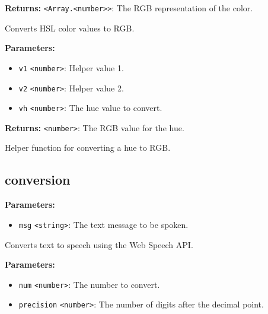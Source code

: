 \documentclass[12pt,a4paper]{article}
\begin{document}
\noindent \textbf{Returns:} \texttt{<Array.<number>>}: The RGB representation of the color.

\noindent Converts HSL color values to RGB.

\vspace{5mm}
\noindent {}


\noindent \textbf{Parameters:}
\begin{itemize}
  \item \texttt{v1} \texttt{<number>}: Helper value 1.
  \item \texttt{v2} \texttt{<number>}: Helper value 2.
  \item \texttt{vh} \texttt{<number>}: The hue value to convert.
\end{itemize}

\noindent \textbf{Returns:} \texttt{<number>}: The RGB value for the hue.

\noindent Helper function for converting a hue to RGB.


\subsection{conversion}
\vspace{5mm}
\noindent {}


\noindent \textbf{Parameters:}
\begin{itemize}
  \item \texttt{msg} \texttt{<string>}: The text message to be spoken.
\end{itemize}

\noindent Converts text to speech using the Web Speech API.

\vspace{5mm}
\noindent {}


\noindent \textbf{Parameters:}
\begin{itemize}
  \item \texttt{num} \texttt{<number>}: The number to convert.
  \item \texttt{precision} \texttt{<number>}: The number of digits after the decimal point.
\end{itemize}
\end{document}
